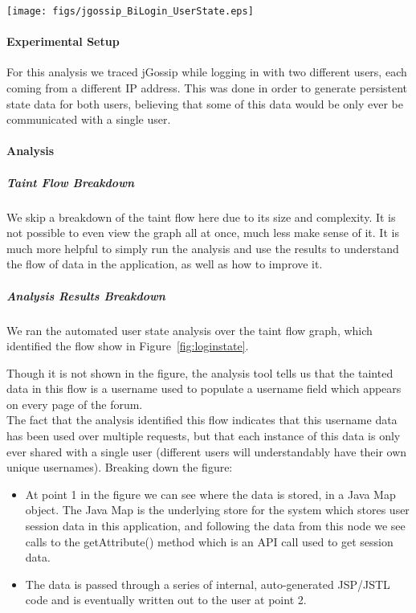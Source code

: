 \documentclass[msc,oneside]{ubcthesis}
\begin{document}
\begin{sidewaysfigure}
\centering
\scalebox{0.44}
{\texttt{[image: figs/jgossip\_BiLogin\_UserState.eps]}}
\caption{jGossip Login User State Analysis Results} 
\label{fig:loginstate}
\end{sidewaysfigure}

\paragraph{Experimental Setup}
For this analysis we traced jGossip while logging in with two different users, each coming from a different IP address. This was done in order to generate persistent state data for both users, believing that some of this data would be only ever be communicated with a single user.

\paragraph{Analysis}
\subparagraph{Taint Flow Breakdown}
We skip a breakdown of the taint flow here due to its size and complexity. It is not possible to even view the graph all at once, much less make sense of it. It is much more helpful to simply run the analysis and use the results to understand the flow of data in the application, as well as how to improve it.

\subparagraph{Analysis Results Breakdown}
We ran the automated user state analysis over the taint flow graph, which identified the flow show in Figure~\ref{fig:loginstate}. 

Though it is not shown in the figure, the analysis tool tells us that the tainted data in this flow is a username used to populate a username field which appears on every page of the forum.\\

The fact that the analysis identified this flow indicates that this username data has been used over multiple requests, but that each instance of this data is only ever shared with a single user (different users will understandably have their own unique usernames). Breaking down the figure: 

\begin{itemize}
\item At point 1 in the figure we can see where the data is stored, in a Java Map object. The Java Map is the underlying store for the system which stores user session data in this application, and following the data from this node we see calls to the getAttribute() method which is an API call used to get session data.
\item The data is passed through a series of internal, auto-generated JSP/JSTL code and is eventually written out to the user at point 2.
\end{itemize}
\end{document}
